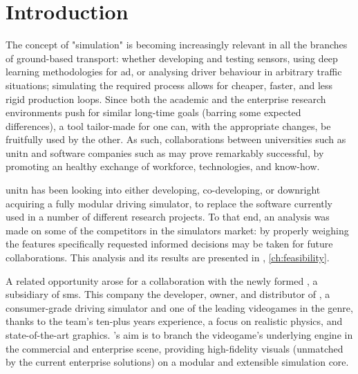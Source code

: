 \chapter*{Introduction}\label{ch:introduction}

The concept of "simulation" is becoming increasingly relevant in all the branches of ground-based transport: whether developing and testing sensors, using deep learning methodologies for \gls{ad}, or analysing driver behaviour in arbitrary traffic situations; simulating the required process allows for cheaper, faster, and less rigid production loops. Since both the academic and the enterprise research environments push for similar long-time goals (barring some expected differences), a tool tailor-made for one can, with the appropriate changes, be fruitfully used by the other. As such, collaborations between universities such as \gls{unitn} and software companies such as  may prove remarkably successful, by promoting an healthy exchange of workforce, technologies, and know-how.

\gls{unitn} has been looking into either developing, co-developing, or downright acquiring a fully modular driving simulator, to replace the software currently used in a number of different research projects. To that end, an analysis was made on some of the competitors in the simulators market: by properly weighing the \glspl{feature} specifically requested informed decisions may be taken for future collaborations. This analysis and its results are presented in , \cref{ch:feasibility}.

A related opportunity arose for a collaboration with the newly formed , a subsidiary of \gls{sms}. This company the developer, owner, and distributor of , a consumer-grade driving simulator and one of the leading videogames in the genre, thanks to the team's ten-plus years experience, a focus on realistic physics, and state-of-the-art graphics. 's aim is to branch the videogame's underlying engine in the commercial and enterprise scene, providing high-fidelity visuals (unmatched by the current enterprise solutions) on a modular and extensible simulation core.

